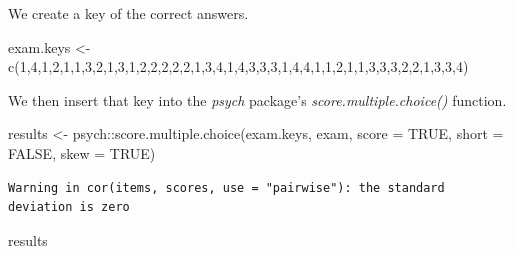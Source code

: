 \documentclass[
  english,
]{book}
\newenvironment{Shaded}{\begin{snugshade}}{\end{snugshade}}
\newcommand{\AttributeTok}[1]{\textcolor[rgb]{0.77,0.63,0.00}{#1}}
\newcommand{\ConstantTok}[1]{\textcolor[rgb]{0.00,0.00,0.00}{#1}}
\newcommand{\DecValTok}[1]{\textcolor[rgb]{0.00,0.00,0.81}{#1}}
\newcommand{\FunctionTok}[1]{\textcolor[rgb]{0.00,0.00,0.00}{#1}}
\newcommand{\NormalTok}[1]{#1}
\newcommand{\OtherTok}[1]{\textcolor[rgb]{0.56,0.35,0.01}{#1}}
\newcommand{\SpecialCharTok}[1]{\textcolor[rgb]{0.00,0.00,0.00}{#1}}
\begin{document}
We create a key of the correct answers.

\begin{Shaded}
\begin{Highlighting}[]
\NormalTok{exam.keys }\OtherTok{\textless{}{-}} \FunctionTok{c}\NormalTok{(}\DecValTok{1}\NormalTok{,}\DecValTok{4}\NormalTok{,}\DecValTok{1}\NormalTok{,}\DecValTok{2}\NormalTok{,}\DecValTok{1}\NormalTok{,}\DecValTok{1}\NormalTok{,}\DecValTok{3}\NormalTok{,}\DecValTok{2}\NormalTok{,}\DecValTok{1}\NormalTok{,}\DecValTok{3}\NormalTok{,}\DecValTok{1}\NormalTok{,}\DecValTok{2}\NormalTok{,}\DecValTok{2}\NormalTok{,}\DecValTok{2}\NormalTok{,}\DecValTok{2}\NormalTok{,}\DecValTok{2}\NormalTok{,}\DecValTok{1}\NormalTok{,}\DecValTok{3}\NormalTok{,}\DecValTok{4}\NormalTok{,}\DecValTok{1}\NormalTok{,}\DecValTok{4}\NormalTok{,}\DecValTok{3}\NormalTok{,}\DecValTok{3}\NormalTok{,}\DecValTok{3}\NormalTok{,}\DecValTok{1}\NormalTok{,}\DecValTok{4}\NormalTok{,}\DecValTok{4}\NormalTok{,}\DecValTok{1}\NormalTok{,}\DecValTok{1}\NormalTok{,}\DecValTok{2}\NormalTok{,}\DecValTok{1}\NormalTok{,}\DecValTok{1}\NormalTok{,}\DecValTok{3}\NormalTok{,}\DecValTok{3}\NormalTok{,}\DecValTok{3}\NormalTok{,}\DecValTok{2}\NormalTok{,}\DecValTok{2}\NormalTok{,}\DecValTok{1}\NormalTok{,}\DecValTok{3}\NormalTok{,}\DecValTok{3}\NormalTok{,}\DecValTok{4}\NormalTok{)  }
\end{Highlighting}
\end{Shaded}

We then insert that key into the \emph{psych} package's \emph{score.multiple.choice()} function.

\begin{Shaded}
\begin{Highlighting}[]
\NormalTok{results }\OtherTok{\textless{}{-}}\NormalTok{ psych}\SpecialCharTok{::}\FunctionTok{score.multiple.choice}\NormalTok{(exam.keys, exam, }\AttributeTok{score =} \ConstantTok{TRUE}\NormalTok{, }\AttributeTok{short =} \ConstantTok{FALSE}\NormalTok{, }\AttributeTok{skew =} \ConstantTok{TRUE}\NormalTok{)}
\end{Highlighting}
\end{Shaded}

\begin{verbatim}
Warning in cor(items, scores, use = "pairwise"): the standard deviation is zero
\end{verbatim}

\begin{Shaded}
\begin{Highlighting}[]
\NormalTok{results}
\end{Highlighting}
\end{Shaded}
\end{document}
